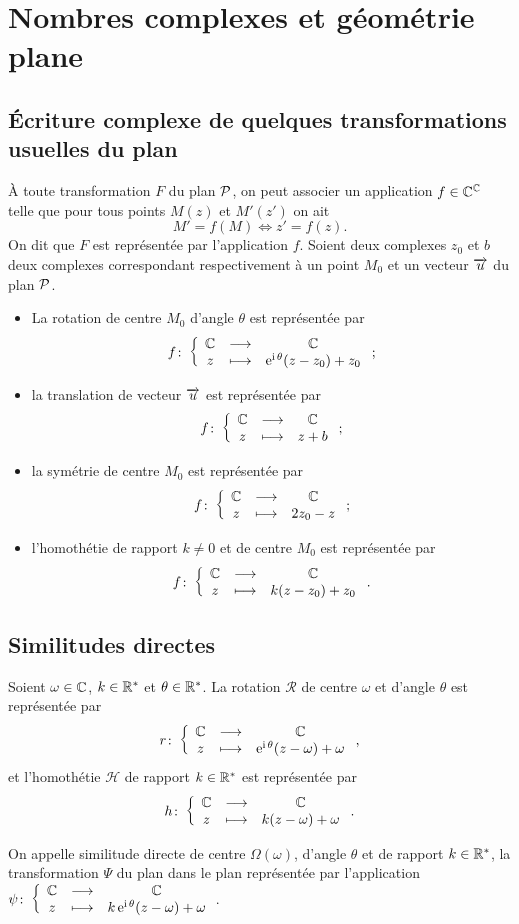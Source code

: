 \section{Nombres complexes et géométrie plane}
\label{sec:complexesetgeometrie}
\subsection{Écriture complexe de quelques transformations usuelles du plan}
\label{subsec:ecriturecomplexeettransformations}
À toute transformation \(F\) du plan \(\P\), on peut associer un application \(f \in \C^{\C}\) telle que pour tous points \(M(z)\) et \(M'(z')\) on ait
\begin{equation}
  M'=f(M) \iff z'=f(z).
\end{equation}
On dit que \(F\) est représentée par l'application \(f\). Soient deux complexes \(z_0\) et \(b\) deux complexes correspondant respectivement à un point \(M_0\) et un vecteur \(\vect{u}\) du plan \(\P\).
\begin{itemize}
\item La rotation de centre \(M_0\) d'angle \(\theta\) est représentée par
  \begin{equation}
    \fonction{f}{\C}{\C}{z}{\expc{}{\theta}(z-z_0) +z_0};
  \end{equation}
\item la translation de vecteur \(\vect{u}\) est représentée par
  \begin{equation}
    \fonction{f}{\C}{\C}{z}{z+b};
  \end{equation}
\item la symétrie de centre \(M_0\) est représentée par
  \begin{equation}
    \fonction{f}{\C}{\C}{z}{2z_0-z};
  \end{equation}
\item l'homothétie de rapport \(k\neq 0\) et de centre \(M_0\) est représentée par
  \begin{equation}
    \fonction{f}{\C}{\C}{z}{k(z-z_0)+z_0}.
  \end{equation}
\end{itemize}
%
\subsection{Similitudes directes}
\label{subsec:simdirecte}
Soient \(\omega \in \C\), \(k\in \R^*\) et \(\theta \in \R^*\). La rotation \(\mathcal{R}\) de centre \(\omega\) et d'angle \(\theta\) est représentée par \[\fonction{r}{\C}{\C}{z}{\expc{}{\theta}(z-\omega)+\omega},\] et l'homothétie \(\mathcal{H}\) de rapport \(k \in \R^*\) est représentée par \[\fonction{h}{\C}{\C}{z}{k(z-\omega)+\omega}.\]
%
\begin{defdef}
  On appelle similitude directe de centre \(\Omega(\omega)\), d'angle \(\theta\) et de rapport \(k \in \R^*\), la transformation \(\Psi\) du plan dans le plan représentée par l'application \(\fonction{\psi}{\C}{\C}{z}{\expc{k}{\theta}(z-\omega)+\omega}\).
\end{defdef}

